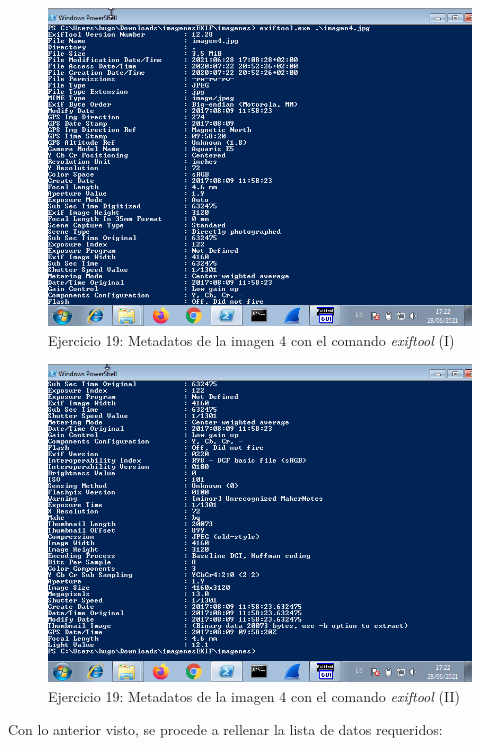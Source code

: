 \documentclass[11pt]{article}
\begin{document}
\begin{figure}[H]
    \caption{Ejercicio 19: Metadatos de la imagen 4 con el comando \textit{exiftool} (I)}
    \centering
    \includegraphics[scale=0.7]{p03/e19-9.png}
\end{figure}

\begin{figure}[H]
    \caption{Ejercicio 19: Metadatos de la imagen 4 con el comando \textit{exiftool} (II)}
    \centering
    \includegraphics[scale=0.7]{p03/e19-10.png}
\end{figure}

Con lo anterior visto, se procede a rellenar la lista de datos requeridos:
\end{document}
